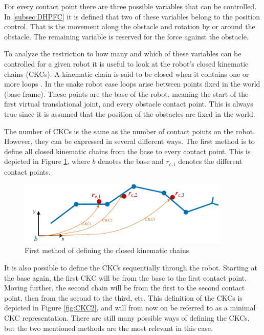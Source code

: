 For every contact point there are three possible variables that can be controlled. In \ref{subsec:DHPFC} it is defined that two of these variables belong to the position control. That is the movement along the obstacle and rotation by or around the obstacle. The remaining variable is reserved for the force against the obstacle.

To analyze the restriction to how many and which of these variables can be controlled for a given robot it is useful to look at the robot's closed kinematic chains (CKCs). A kinematic chain is said to be closed when it contains one or more loops \cite{lynch2017modern}. In the snake robot case loops arise between points fixed in the world (base frame). These points are the base of the robot, meaning the start of the first virtual translational joint, and every obstacle contact point. This is always true since it is assumed that the position of the obstacles are fixed in the world.

The number of CKCs is the same as the number of contact points on the robot. However, they can be expressed in several different ways. The first method is to define all closed kinematic chains from the base to every contact point. This is depicted in Figure \ref{fig:CKC1}, where $b$ denotes the base and $r_{c,i}$ denotes the different contact points.

\begin{figure}[h!]
    \centering
    \includegraphics[width=0.9\textwidth]{figures/theory/CKC1.pdf}
    \caption{First method of defining the closed kinematic chains}
    \label{fig:CKC1}
\end{figure}

It is also possible to define the CKCs sequentially through the robot. Starting at the base again, the first CKC will be from the base to the first contact point. Moving further, the second chain will be from the first to the second contact point, then from the second to the third, etc. This definition of the CKCs is depicted in Figure \ref{fig:CKC2}, and will from now on be referred to as a minimal CKC representation. There are still many possible ways of defining the CKCs, but the two mentioned methods are the most relevant in this case.

